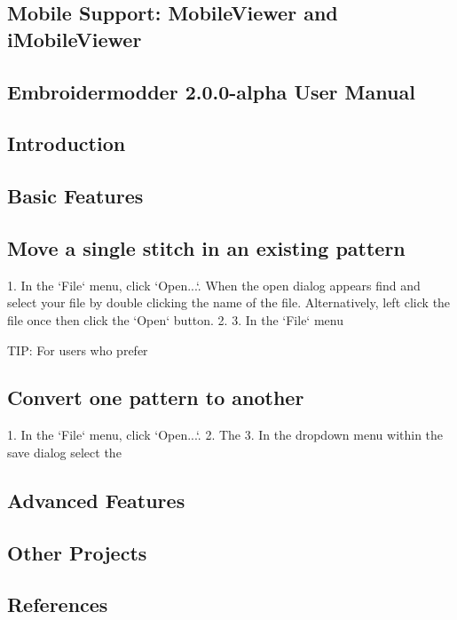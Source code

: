 \documentclass[a4paper]{report}
\begin{document}
{{{{{{\subsection{Mobile Support: MobileViewer and iMobileViewer}

\subsection{Embroidermodder 2.0.0-alpha User Manual}

\subsection{Introduction}

\subsection{Basic Features}

\subsection{Move a single stitch in an existing pattern}

1. In the `File` menu, click `Open...`. When the open dialog appears find and select your file by double clicking the name of the file. Alternatively, left click the file once then click the `Open` button.
2. 
3. In the `File` menu

TIP: For users who prefer

\subsection{Convert one pattern to another}

1. In the `File` menu, click `Open...`.
2.  The
3.  In the dropdown menu within the save dialog select the

\subsection{Advanced Features}

\subsection{Other Projects}

\subsection{References}

}}}}}}
\end{document}
